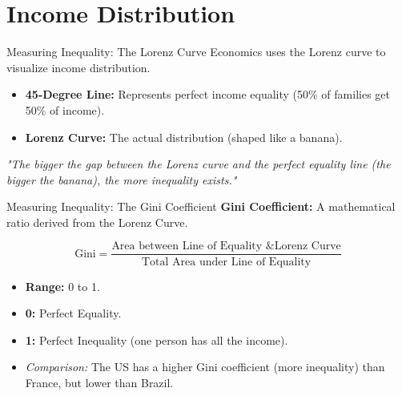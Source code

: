 \documentclass{beamer}
\begin{document}
\section{Income Distribution}

\begin{frame}{Measuring Inequality: The Lorenz Curve}
    Economics uses the Lorenz curve to visualize income distribution.
    
    \begin{itemize}
        \item \textbf{45-Degree Line:} Represents perfect income equality (50\% of families get 50\% of income).
        \item \textbf{Lorenz Curve:} The actual distribution (shaped like a banana).
    \end{itemize}

    \vspace{0.5cm}
    \begin{center}
        \textit{"The bigger the gap between the Lorenz curve and the perfect equality line (the bigger the banana), the more inequality exists."}
    \end{center}
\end{frame}

\begin{frame}{Measuring Inequality: The Gini Coefficient}
    \textbf{Gini Coefficient:} A mathematical ratio derived from the Lorenz Curve.
    
    \[ \text{Gini} = \frac{\text{Area between Line of Equality \& Lorenz Curve}}{\text{Total Area under Line of Equality}} \]

    \begin{itemize}
        \item \textbf{Range:} 0 to 1.
        \item \textbf{0:} Perfect Equality.
        \item \textbf{1:} Perfect Inequality (one person has all the income).
        \item \textit{Comparison:} The US has a higher Gini coefficient (more inequality) than France, but lower than Brazil.
    \end{itemize}
\end{frame}
\end{document}
